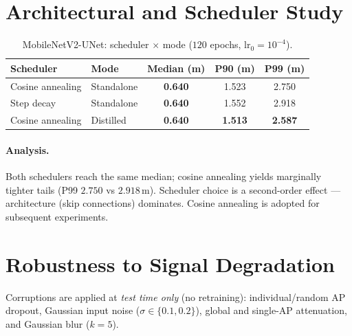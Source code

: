 \documentclass[11pt,a4paper]{article}
\newcommand{\best}[1]{\textcolor{ours}{\textbf{#1}}}
\begin{document}
\section{Architectural and Scheduler Study}

\begin{table}[H]
\centering
\caption{MobileNetV2-UNet: scheduler $\times$ mode ($120$ epochs, lr$_0=10^{-4}$).}
\begin{tabular}{@{}llccc@{}}
\toprule
\textbf{Scheduler} & \textbf{Mode} & \textbf{Median (m)} & \textbf{P90 (m)} & \textbf{P99 (m)} \\
\midrule
Cosine annealing & Standalone & \best{0.640} & 1.523 & 2.750 \\
Step decay       & Standalone & \best{0.640} & 1.552 & 2.918 \\
Cosine annealing & Distilled  & \best{0.640} & \best{1.513} & \best{2.587} \\
\bottomrule
\end{tabular}
\end{table}

\paragraph{Analysis.} Both schedulers reach the same median; cosine annealing yields marginally
tighter tails (P99 $2.750$ vs $2.918$\,m). Scheduler choice is a second-order effect ---
architecture (skip connections) dominates. Cosine annealing is adopted for subsequent
experiments.

\section{Robustness to Signal Degradation}
\label{sec:robust}

Corruptions are applied at \emph{test time only} (no retraining): individual/random AP dropout,
Gaussian input noise ($\sigma\in\{0.1,0.2\}$), global and single-AP attenuation, and Gaussian
blur ($k=5$).
\end{document}
